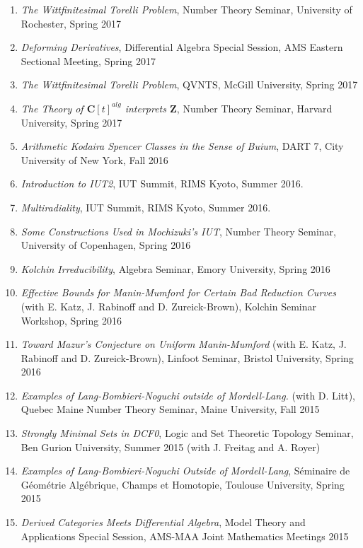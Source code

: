 \documentclass[a4paper,10pt]{article}
\newcommand{\CC}{\mathbf{C}}
\newcommand{\ZZ}{\mathbf{Z}}
\begin{document}
\begin{enumerate}
	\item \emph{The Wittfinitesimal Torelli Problem}, Number Theory Seminar, University of Rochester, Spring 2017 
	\item \emph{Deforming Derivatives}, Differential Algebra Special Session, AMS Eastern Sectional Meeting, Spring 2017
	\item \emph{The Wittfinitesimal Torelli Problem}, QVNTS, McGill University, Spring 2017 
	\item \emph{The Theory of $\CC[t]^{alg}$ interprets $\ZZ$}, Number Theory Seminar, Harvard University, Spring 2017
	\item \emph{Arithmetic Kodaira Spencer Classes in the Sense of Buium}, DART 7, City University of New York, Fall 2016 
	\item \emph{Introduction to IUT2}, IUT Summit, RIMS Kyoto, Summer 2016.
	\item \emph{Multiradiality},  IUT Summit, RIMS Kyoto, Summer 2016. 
	\item \emph{Some Constructions Used in Mochizuki's IUT},  Number Theory Seminar, University of Copenhagen,  Spring 2016
	\item \emph{Kolchin Irreducibility}, Algebra Seminar, Emory University, Spring 2016 
	\item \emph{Effective Bounds for Manin-Mumford for Certain Bad Reduction Curves} (with E. Katz, J. Rabinoff and D. Zureick-Brown), Kolchin Seminar Workshop, Spring 2016
	\item \emph{Toward Mazur's Conjecture on Uniform Manin-Mumford} (with E. Katz, J. Rabinoff and D. Zureick-Brown), Linfoot Seminar, Bristol University, Spring 2016
	\item \emph{Examples of Lang-Bombieri-Noguchi outside of Mordell-Lang.} (with D. Litt),  Quebec Maine Number Theory Seminar, Maine University, Fall 2015
	\item \emph{Strongly Minimal Sets in DCF0},  Logic and Set Theoretic Topology Seminar, Ben Gurion University, Summer 2015 (with J. Freitag and A. Royer)
	\item \emph{Examples of Lang-Bombieri-Noguchi Outside of Mordell-Lang}, S\'eminaire de G\'eom\'etrie Alg\'ebrique, Champs et Homotopie, Toulouse University, Spring 2015
	\item \emph{Derived Categories Meets Differential Algebra}, Model Theory and Applications Special Session, AMS-MAA Joint Mathematics Meetings 2015

\end{enumerate}
\end{document}
